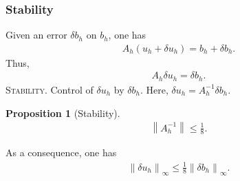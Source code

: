 \documentclass[11pt,a4paper,center,notitlepage]{article}
\numberwithin{equation}{section}
\newtheorem{prop}{Proposition}[section]
\begin{document}
\subsubsection{Stability}
Given an error $\delta b_h$ on $b_h$, one has
\begin{align}
{A_h}\left( {{u_h} + \delta {u_h}} \right) = {b_h} + \delta {b_h}.
\end{align}
Thus,
\begin{align}
{A_h}\delta {u_h} = \delta {b_h}.
\end{align}
\textsc{Stability.} Control of $\delta u_h$ by $\delta b_h$. Here, $\delta {u_h} = A_h^{ - 1}\delta {b_h}$.
\begin{prop}[Stability]\label{prop1.3}
\begin{align}
\label{1.20}
\left\| {A_h^{ - 1}} \right\| \le \frac{1}{8}.
\end{align}
\end{prop}
As a consequence, one has
\begin{align}
{\left\| {\delta {u_h}} \right\|_\infty } \le \frac{1}{8}{\left\| {\delta {b_h}} \right\|_\infty }.
\end{align}
\end{document}
